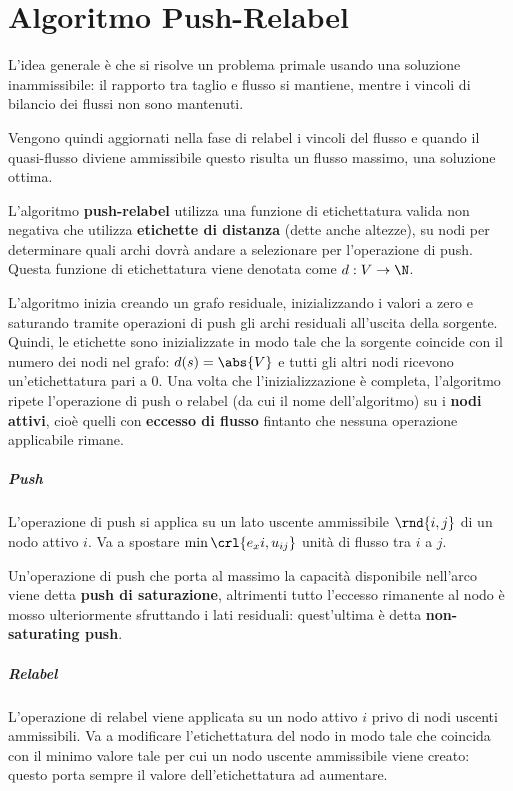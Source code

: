 \documentclass[\main/main.tex]{subfiles}
\begin{document}
\chapter{Algoritmo Push-Relabel}
L'idea generale è che si risolve un problema primale usando una soluzione inammissibile: il rapporto tra taglio e flusso si mantiene, mentre i vincoli di bilancio dei flussi non sono mantenuti.

Vengono quindi aggiornati nella fase di relabel i vincoli del flusso e quando il quasi-flusso diviene ammissibile questo risulta un flusso massimo, una soluzione ottima.

L'algoritmo \textbf{push-relabel} utilizza una funzione di etichettatura valida non negativa che utilizza \textbf{etichette di distanza} (dette anche altezze), su nodi per determinare quali archi dovrà andare a selezionare per l'operazione di push. Questa funzione di etichettatura viene denotata come \(d: V \rightarrow \N \).

L'algoritmo inizia creando un grafo residuale, inizializzando i valori a zero e saturando tramite operazioni di push gli archi residuali all'uscita della sorgente. Quindi, le etichette sono inizializzate in modo tale che la sorgente coincide con il numero dei nodi nel grafo: \(d(s) = \abs{V}\) e tutti gli altri nodi ricevono un'etichettatura pari a \(0\). Una volta che l'inizializzazione è completa, l'algoritmo ripete l'operazione di push o relabel (da cui il nome dell'algoritmo) su i \textbf{nodi attivi}, cioè quelli con \textbf{eccesso di flusso} fintanto che nessuna operazione applicabile rimane.

\paragraph*{Push} L'operazione di push si applica su un lato uscente ammissibile \(\rnd{i,j}\) di un nodo attivo \(i\). Va a spostare \(\min\crl{e_x{i}, u_{ij}}\) unità di flusso tra \(i\) a \(j\).

Un'operazione di push che porta al massimo la capacità disponibile nell'arco viene detta \textbf{push di saturazione}, altrimenti tutto l'eccesso rimanente al nodo è mosso ulteriormente sfruttando i lati residuali: quest'ultima è detta \textbf{non-saturating push}.

\paragraph*{Relabel} L'operazione di relabel viene applicata su un nodo attivo \(i\) privo di nodi uscenti ammissibili. Va a modificare l'etichettatura del nodo in modo tale che coincida con il minimo valore tale per cui un nodo uscente ammissibile viene creato: questo porta sempre il valore dell'etichettatura ad aumentare.
\end{document}
